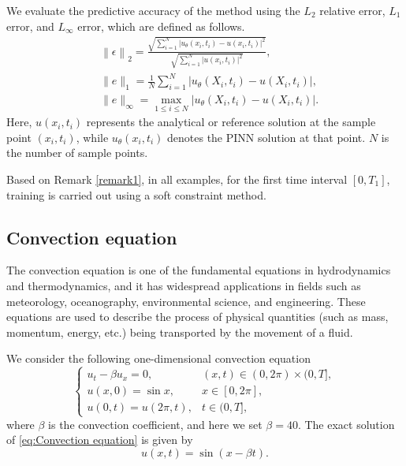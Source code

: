 \documentclass[preprint]{elsarticle}
\numberwithin{table}{section}
\numberwithin{equation}{section}
\numberwithin{figure}{section}
\begin{document}
\begin{CJK}{UTF8}{gbsn}
We evaluate the predictive accuracy of the method using the $L_2$
  relative error, $L_1$
  error, and $L_{\infty}$
  error, which are defined as follows.
  \begin{align}
&\left\|\epsilon\right\|_{2}= \frac{\sqrt{\sum_{i=1}^{N}\left|u_{\theta}(x_{i},t_{i})-u(x_{i},t_{i})\right|^{2}}}{\sqrt{\sum_{i=1}^{N}\left|u(x_{i},t_{i})\right|^{2}}}, \label{eq:l2_norm} \\
 &\|e\|_1 = \frac{1}{N} \sum_{i=1}^{N} \left| u_\theta(X_i, t_i) - u(X_i, t_i) \right|, \label{eq:l1_norm} \\
 &\|e\|_\infty = \max_{1 \leq i \leq N} \left| u_\theta(X_i, t_i) - u(X_i, t_i) \right|. \label{eq:linf_norm}
\end{align}
  Here, $u(x_{i},t_{i})$ represents the analytical or reference solution at the sample point $(x_{i},t_{i})$, while $u_{\theta}(x_{i},t_{i})$ denotes the PINN solution at that point. $N$ is the number of sample points. 
  
   Based on Remark \ref{remark1}, in all examples, for the first time interval $[0,T_1]$, training is carried out using a soft constraint method.
 



\subsection{Convection equation}\label{sec:Convection equation}
The convection equation is one of the fundamental equations in hydrodynamics and thermodynamics, and it has widespread applications in fields such as meteorology, oceanography, environmental science, and engineering. These equations are used to describe the process of physical quantities (such as mass, momentum, energy, etc.) being transported by the movement of a fluid.

We consider the following one-dimensional convection equation
\begin{equation}\label{eq:Convection equation}
\begin{cases}
u_t-\beta u_x=0, &(x,t) \in (0,2\pi) \times  (0,T],\\
u(x,0)= \sin{ x},& x\in   [0,2\pi],   \\
u(0,t)=u(2\pi,t),& t\in  (0,T],
\end{cases}
\end{equation}
where $\beta$ is the convection coefficient, and here we set $\beta=40$. The exact solution of \eqref{eq:Convection equation} is given by  
\begin{equation*}\label{eq:Convection Exact}
u(x,t)=\sin{(x-\beta t)}.
\end{equation*}


\end{CJK}
\end{document}
